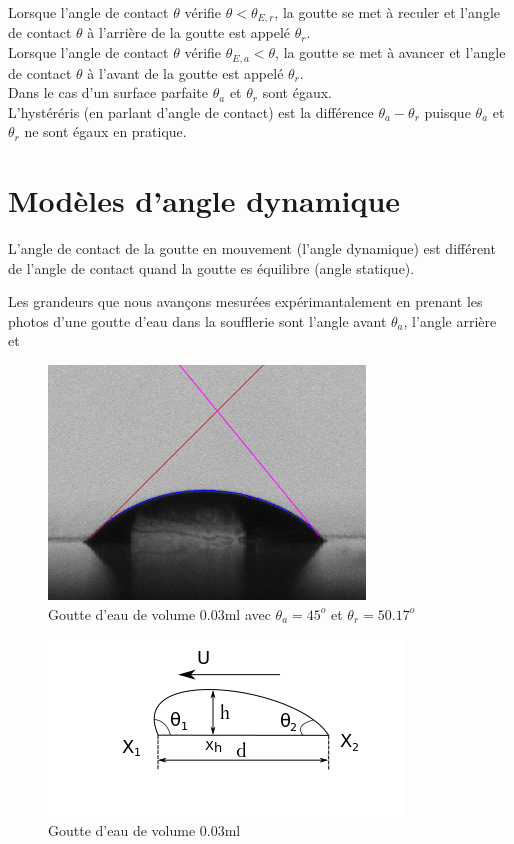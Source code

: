 \documentclass[french]{article}
\begin{document}
Lorsque l'angle de contact $\theta$ vérifie $\theta < \theta_{E,r}$, la goutte se met à reculer et l'angle de contact $\theta$ à l'arrière de la goutte est appelé $\theta_{r}$.\\

Lorsque l'angle de contact $\theta$ vérifie $\theta_{E,a} < \theta$, la goutte se met à avancer et l'angle de contact $\theta$ à l'avant de la goutte est appelé $\theta_{r}$.\\

Dans le cas d'un surface parfaite $\theta_{a}$ et $\theta_{r}$ sont égaux.\\

L'hystéréris (en parlant d'angle de contact) est la différence $\theta_{a}-\theta_{r}$ puisque $\theta_{a}$ et $\theta_{r}$ ne sont égaux en pratique.

\section{Modèles d'angle dynamique}

L'angle de contact de la goutte en mouvement (l'angle dynamique) est différent de l'angle de contact quand la goutte es équilibre (angle statique).



Les grandeurs que nous avançons mesurées expérimantalement en prenant les photos d'une goutte d'eau dans la soufflerie sont l'angle avant $\theta_{a}$, l'angle arrière et 



\begin{figure}[ht]
	\centering
	\includegraphics[scale = 0.6]{./image/crop_tvitesse=28_volume=003.png}
	\caption{Goutte d'eau de volume $0.03$ml avec $\theta_{a} = 45^{o}$ et $\theta_{r} = 50.17^{o}$}
\end{figure}

\begin{figure}[ht]
	\centering
	\includegraphics[scale = 0.6]{./image/rrgou2.png}
	\caption{Goutte d'eau de volume $0.03$ml}
\end{figure}
\end{document}
